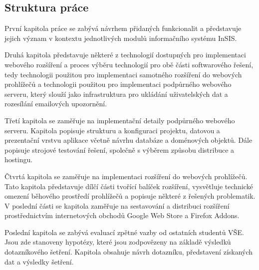 \subsection*{Struktura práce}

První kapitola práce se zabývá návrhem přidaných funkcionalit a představuje jejich význam v kontextu jednotlivých modulů informačního systému InSIS.

Druhá kapitola představuje některé z technologií dostupných pro implementaci webového rozšíření a proces výběru technologií pro obě části softwarového řešení, tedy technologii použitou pro implementaci samotného rozšíření do webových prohlížečů a technologii použitou pro implementaci podpůrného webového serveru, který slouží jako infrastruktura pro ukládání uživatelských dat a rozesílání emailových upozornění.

Třetí kapitola se zaměřuje na implementační detaily podpůrného webového serveru. Kapitola popisuje strukturu a konfiguraci projektu, datovou a prezentační vrstvu aplikace včetně návrhu databáze a doménových objektů. Dále popisuje strojové testování řešení, společně s výběrem způsobu distribuce a hostingu.  

Čtvrtá kapitola se zaměřuje na implementaci rozšíření do webových prohlížečů. Tato kapitola představuje dílčí části tvořící balíček rozšíření, vysvětluje technické omezení běhového prostředí prohlížečů a popisuje některé z řešených problematik. V poslední části se kapitola zaměřuje na sestavování a distribuci rozšíření prostřednictvím internetových obchodů Google Web Store a Firefox Addons.

Poslední kapitola se zabývá evaluací zpětné vazby od ostatních studentů VŠE. Jsou zde stanoveny hypotézy, které jsou zodpovězeny na základě výsledků dotazníkového šetření. Kapitola obsahuje návrh dotazníku, představení získaných dat a výsledky šetření. 



